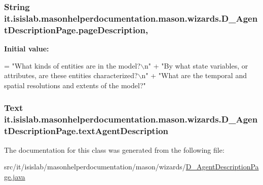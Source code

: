 \hypertarget{classit_1_1isislab_1_1masonhelperdocumentation_1_1mason_1_1wizards_1_1_d___agent_description_page_a8ba359bbeadb34933a78f865581fdf15}{
\subsubsection[{page\-Description}]{\setlength{\rightskip}{0pt plus 5cm}String it.\-isislab.\-masonhelperdocumentation.\-mason.\-wizards.\-D\-\_\-\-Agent\-Description\-Page.\-page\-Description\hspace{0.3cm}{\ttfamily [static]}, {\ttfamily [private]}}}\label{classit_1_1isislab_1_1masonhelperdocumentation_1_1mason_1_1wizards_1_1_d___agent_description_page_a8ba359bbeadb34933a78f865581fdf15}
{\bfseries Initial value\-:}
\begin{DoxyCode}
= \textcolor{stringliteral}{"What kinds of entities are in the model?\(\backslash\)n"}
                                          + \textcolor{stringliteral}{"By what state variables, or attributes, are these entities
       characterized?\(\backslash\)n"}
                                          + \textcolor{stringliteral}{"What are the temporal and spatial resolutions and extents of
       the model?"}
\end{DoxyCode}
\hypertarget{classit_1_1isislab_1_1masonhelperdocumentation_1_1mason_1_1wizards_1_1_d___agent_description_page_adeaf5a5649c9280ceb38690357c70a1b}{
\subsubsection[{text\-Agent\-Description}]{\setlength{\rightskip}{0pt plus 5cm}Text it.\-isislab.\-masonhelperdocumentation.\-mason.\-wizards.\-D\-\_\-\-Agent\-Description\-Page.\-text\-Agent\-Description\hspace{0.3cm}{\ttfamily [private]}}}\label{classit_1_1isislab_1_1masonhelperdocumentation_1_1mason_1_1wizards_1_1_d___agent_description_page_adeaf5a5649c9280ceb38690357c70a1b}


The documentation for this class was generated from the following file\-:\begin{DoxyCompactItemize}
\item 
src/it/isislab/masonhelperdocumentation/mason/wizards/\hyperlink{_d___agent_description_page_8java}{D\-\_\-\-Agent\-Description\-Page.\-java}\end{DoxyCompactItemize}
